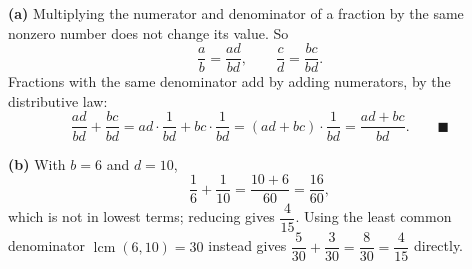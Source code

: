 \textbf{(a)} Multiplying the numerator and denominator of a fraction by the same nonzero number does not change its value. So
\[\dfrac ab=\dfrac{ad}{bd},\qquad\dfrac cd=\dfrac{bc}{bd}.\]
Fractions with the same denominator add by adding numerators, by the distributive law:
\[\dfrac{ad}{bd}+\dfrac{bc}{bd}=ad\cdot\dfrac1{bd}+bc\cdot\dfrac1{bd}=(ad+bc)\cdot\dfrac{1}{bd}=\dfrac{ad+bc}{bd}.\qquad\blacksquare\]

\textbf{(b)} With $b=6$ and $d=10$,
\[\dfrac16+\dfrac1{10}=\dfrac{10+6}{60}=\dfrac{16}{60},\]
which is not in lowest terms; reducing gives $\boxed{\dfrac4{15}}$. Using the least common denominator $\operatorname{lcm}(6,10)=30$ instead gives $\dfrac5{30}+\dfrac3{30}=\dfrac8{30}=\dfrac4{15}$ directly.

